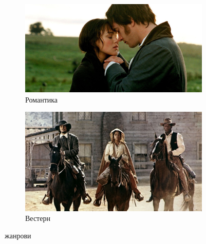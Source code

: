 \documentclass{article}
\begin{document}
\begin{figure}[htbp]
  \centering
  \begin{subfigure}{0.45\textwidth}
    \centering
    \includegraphics[width=\linewidth]{slike/romantic.jpg} %
    \caption{Романтика}
    \label{fig:slika9}
  \end{subfigure}
  \hfill
  \begin{subfigure}{0.45\textwidth}
    \centering
    \includegraphics[width=\linewidth]{slike/western.jpg} %
    \caption{Вестерн}
    \label{fig:slika10}
  \end{subfigure}
  \caption{жанрови}
  \label{fig:zajednicki_naslov6}
\end{figure}
\end{document}
